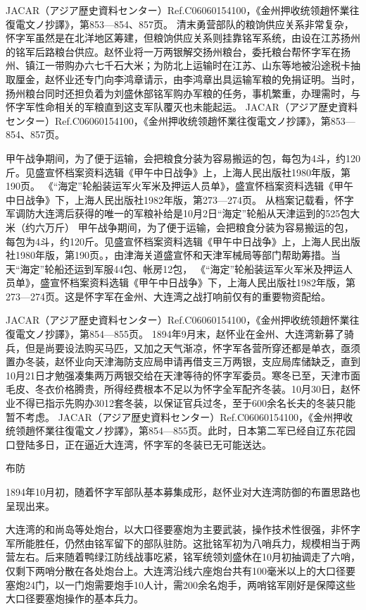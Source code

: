 \documentclass[12pt,UTF8]{ctexbook}
\begin{document}
JACAR（アジア歴史資料センター）Ref.C06060154100，《金州押收统领趙怀業往復電文ノ抄譯》，第853—854、857页。
清末勇营部队的粮饷供应关系非常复杂，怀字军虽然是在北洋地区筹建，但粮饷供应关系则挂靠铭军系统，由设在江苏扬州的铭军后路粮台供应。赵怀业将一万两银解交扬州粮台，委托粮台帮怀字军在扬州、镇江一带购办六七千石大米；为防北上运输时在江苏、山东等地被沿途税卡抽取厘金，赵怀业还专门向李鸿章请示，由李鸿章出具运输军粮的免捐证明。当时，扬州粮台同时还担负着为刘盛休部铭军购办军粮的任务，事机繁重，办理需时，与怀字军性命相关的军粮直到这支军队覆灭也未能起运。 JACAR（アジア歴史資料センター）Ref.C06060154100，《金州押收统领趙怀業往復電文ノ抄譯》，第853—854、857页。

甲午战争期间，为了便于运输，会把粮食分装为容易搬运的包，每包为4斗，约120斤。见盛宣怀档案资料选辑《甲午中日战争》上，上海人民出版社1980年版，第190页。
《“海定”轮船装运军火军米及押运人员单》，盛宣怀档案资料选辑《甲午中日战争》下，上海人民出版社1982年版，第273—274页。
从档案记载看，怀字军调防大连湾后获得的唯一的军粮补给是10月2日“海定”轮船从天津运到的525包大米（约六万斤） 甲午战争期间，为了便于运输，会把粮食分装为容易搬运的包，每包为4斗，约120斤。见盛宣怀档案资料选辑《甲午中日战争》上，上海人民出版社1980年版，第190页。，由津海关道盛宣怀和天津军械局等部门帮助筹措。当天“海定”轮船还运到军服44包、帐房12包， 《“海定”轮船装运军火军米及押运人员单》，盛宣怀档案资料选辑《甲午中日战争》下，上海人民出版社1982年版，第273—274页。这是怀字军在金州、大连湾之战打响前仅有的重要物资配给。

JACAR（アジア歴史資料センター）Ref.C06060154100，《金州押收统领趙怀業往復電文ノ抄譯》，第854—855页。
1894年9月末，赵怀业在金州、大连湾新募了骑兵，但是尚要设法购买马匹，又加之天气渐凉，怀字军各营所穿还都是单衣，亟须置办冬装，赵怀业向天津海防支应局申请再借支三万两银，支应局库储缺乏，直到10月21日才勉强凑集两万两银交给在天津等待的怀字军委员。寒冬已至，天津市面毛皮、冬衣价格腾贵，所得经费根本不足以为怀字全军配齐冬装。10月30日，赵怀业不得已指示先购办3012套冬装，以保证官兵过冬，至于600余名长夫的冬装只能暂不考虑。 JACAR（アジア歴史資料センター）Ref.C06060154100，《金州押收统领趙怀業往復電文ノ抄譯》，第854—855页。此时，日本第二军已经自辽东花园口登陆多日，正在逼近大连湾，怀字军的冬装已无可能送达。

布防

1894年10月初，随着怀字军部队基本募集成形，赵怀业对大连湾防御的布置思路也呈现出来。

大连湾的和尚岛等处炮台，以大口径要塞炮为主要武装，操作技术性很强，非怀字军所能胜任，仍然由铭军留下的部队驻防。这批铭军初为八哨兵力，规模相当于两营左右。后来随着鸭绿江防线战事吃紧，铭军统领刘盛休在10月初抽调走了六哨，仅剩下两哨分散在各处炮台上。大连湾沿线六座炮台共有100毫米以上的大口径要塞炮24门，以一门炮需要炮手10人计，需200余名炮手，两哨铭军刚好是保障这些大口径要塞炮操作的基本兵力。
\end{document}
